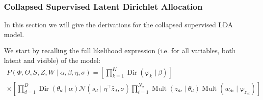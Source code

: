 \documentclass{article} %
\DeclareMathOperator{\Dir}{Dir}
\DeclareMathOperator{\Mult}{Mult}
\renewcommand{\phi}{\varphi}
\begin{document}
\subsubsection{Collapsed Supervised Latent Dirichlet Allocation}
In this section we will give the derivations for the collapsed supervised LDA model.

We start by recalling the full likelihood expression (i.e. for all variables, both latent and visible) of the model:
\begin{equation}
\label{eq:prodpart}
\begin{gathered}
P(\Phi, \Theta, S, Z, W \mid \alpha, \beta, \eta, \sigma) = \left[ \prod_{k = 1}^K \Dir(\phi_k \mid \beta) \right]  \\
\times \left[ \prod_{d = 1}^D \Dir(\theta_d \mid \alpha) \mathcal{N}(s_d \mid \eta^\top \bar{z}_d, \sigma) \prod_{i = 1}^{N_d} \Mult(z_{di} \mid \theta_d) \Mult(w_{di} \mid \varphi_{z_{di}}) \right]
\end{gathered}
\end{equation}
\end{document}

